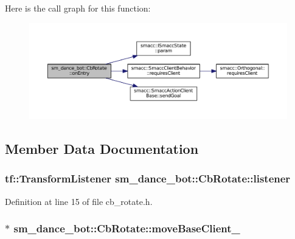 Here is the call graph for this function\+:
\nopagebreak
\begin{figure}[H]
\begin{center}
\leavevmode
\includegraphics[width=350pt]{classsm__dance__bot_1_1CbRotate_ad4e05a82d567baea5e373b7eec187760_cgraph}
\end{center}
\end{figure}




\subsection{Member Data Documentation}
\subsubsection[{\texorpdfstring{listener}{listener}}]{\setlength{\rightskip}{0pt plus 5cm}tf\+::\+Transform\+Listener sm\+\_\+dance\+\_\+bot\+::\+Cb\+Rotate\+::listener}\hypertarget{classsm__dance__bot_1_1CbRotate_a40f03a928591fed26f84a35be9ddc741}{}\label{classsm__dance__bot_1_1CbRotate_a40f03a928591fed26f84a35be9ddc741}


Definition at line 15 of file cb\+\_\+rotate.\+h.

\subsubsection[{\texorpdfstring{move\+Base\+Client\+\_\+}{moveBaseClient_}}]{ $\ast$ sm\+\_\+dance\+\_\+bot\+::\+Cb\+Rotate\+::move\+Base\+Client\+\_\+}\hypertarget{classsm__dance__bot_1_1CbRotate_aa34923f194d46a8fd814f0133baba238}{}\label{classsm__dance__bot_1_1CbRotate_aa34923f194d46a8fd814f0133baba238}


